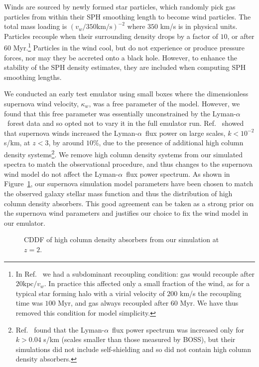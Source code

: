 \documentclass[a4paper,11pt]{article}
\newcommand{\Lya}{Lyman-$\alpha$}
\begin{document}
Winds are sourced by newly formed star particles, which randomly pick gas particles from within their SPH smoothing length to become wind particles. The total mass loading is $(v_w/ 350 \mathrm{km/s})^{-2}$ where $350$ km/s is in physical units. Particles recouple when their surrounding density drops by a factor of $10$, or after $60$ Myr.\footnote{In Ref.~\cite{Bird:2022} we had a subdominant recoupling condition: gas would recouple after $20 \mathrm{kpc} / v_w$. In practice this affected only a small fraction of the wind, as for a typical star forming halo with a virial velocity of $200$ km/s the recoupling time was $100$ Myr, and gas always recoupled after $60$ Myr. We have thus removed this condition for model simplicity.} Particles in the wind cool, but do not experience or produce pressure forces, nor may they be accreted onto a black hole. However, to enhance the stability of the SPH density estimates, they are included when computing SPH smoothing lengths.

We conducted an early test emulator using small boxes where the dimensionless supernova wind velocity, $\kappa_w$, was a free parameter of the model. However, we found that this free parameter was essentially unconstrained by the \Lya~forest data and so opted not to vary it in the full emulator run. Ref.~\cite{Bolton:2017} showed that supernova winds increased the \Lya~flux power on large scales, $k < 10^{-2}$ s/km, at $z < 3$, by around $10\%$, due to the presence of additional high column density systems\footnote{Ref.~\cite{Viel:2013} found that the \Lya~flux power spectrum was increased only for $ k > 0.04$ s/km (scales smaller than those measured by BOSS), but their simulations did not include self-shielding and so did not contain high column density absorbers.}. We remove high column density systems from our simulated spectra to match the observational procedure, and thus changes to the supernova wind model do not affect the \Lya~flux power spectrum. As shown in Figure~\ref{fig:DLACDDF}, our supernova simulation model parameters have been chosen to match the observed galaxy stellar mass function and thus the distribution of high column density absorbers. This good agreement can be taken as a strong prior on the supernova wind parameters and justifies our choice to fix the wind model in our emulator.

\begin{figure}
 \caption{CDDF of high column density absorbers from our simulation at $z=2$.}
 \label{fig:DLACDDF}
\end{figure}
\end{document}
